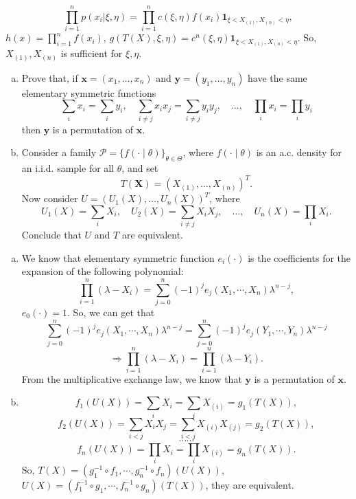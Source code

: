 \begin{solution}
    \[
        \prod_{i=1}^np(x_i|\xi, \eta)=\prod_{i=1}^nc(\xi, \eta) f(x_i)\mathbf{1}_{\xi<X_{(1)}, X_{(n)}<\eta}, 
    \]
    $h(x)=\prod_{i=1}^nf(x_i)$, $g(T(X),\xi,\eta)=c^n(\xi,\eta)\mathbf{1}_{\xi<X_{(1)}, X_{(n)}<\eta}$. So, $X_{(1)}, X_{(n)}$ is sufficient for $\xi,\eta$. 
\end{solution}


\begin{exercise}
    \begin{enumerate}[(a)]
        \item Prove that, if \(\mathbf{x}=\left(x_{1}, \ldots, x_{n}\right)\) and \(\mathbf{y}=\left(y_{1}, \ldots, y_{n}\right)\) have the same elementary symmetric functions
        \[
            \sum_{i} x_{i}=\sum_{i} y_{i}, \quad \sum_{i \neq j} x_{i} x_{j}=\sum_{i \neq j} y_{i} y_{j}, \quad \ldots, \quad \prod_{i} x_{i}=\prod_{i} y_{i}
        \]
        then \(\mathbf{y}\) is a permutation of \(\mathbf{x}\). 
        \item Consider a family \(\mathcal{P}=\{f(\cdot \mid \theta)\}_{\theta \in \Theta}\), where \(f(\cdot \mid \theta)\) is an a.c. density for an i.i.d. sample for all \(\theta\), and set
        \[
            T(\mathbf{X})=\left(X_{(1)}, \ldots, X_{(n)}\right)^T .
        \]
        Now consider \(U=\left(U_{1}(X), \ldots, U_{n}(X)\right)^T\), where
        \[
            U_{1}(X)=\sum_{i} X_{i}, \quad U_{2}(X)=\sum_{i \neq j} X_{i} X_{j}, \quad \ldots, \quad U_{n}(X)=\prod_{i} X_{i} .
        \]
        Conclude that \(U\) and \(T\) are equivalent. 
    \end{enumerate}
\end{exercise}

\begin{solution}
    \begin{enumerate}[(a)]
        \item We know that elementary symmetric function $e_i(\cdot)$ is the coefficients for the expansion of the following polynomial: 
        \[
            \prod_{i=1}^n(\lambda-X_i)=\sum_{j=0}^n(-1)^je_j(X_1,\cdots,X_n)\lambda^{n-j}, 
        \]
        $e_0(\cdot)=1$. So, we can get that 
        \[
            \sum_{j=0}^n(-1)^je_j(X_1,\cdots,X_n)\lambda^{n-j}=\sum_{j=0}^n(-1)^je_j(Y_1,\cdots,Y_n)\lambda^{n-j}
        \]
        \[
            \Rightarrow \prod_{i=1}^n(\lambda-X_i)=\prod_{i=1}^n(\lambda-Y_i). 
        \]
        From the multiplicative exchange law, we know that \(\mathbf{y}\) is a permutation of \(\mathbf{x}\). 
        \item 
        \[
            f_1(U(X))=\sum_iX_i=\sum_iX_{(i)}=g_1(T(X)), 
        \]
        \[
            f_2(U(X))=\sum_{i<j}X_iX_j=\sum_{i<j}X_{(i)}X_{(j)}=g_2(T(X)), 
        \]
        \[
            \cdots\cdots
        \]
        \[
            f_n(U(X))=\prod_{i}X_i=\prod_{i}X_{(i)}=g_n(T(X)). 
        \]
        So, $T(X)=(g_1^{-1}\circ f_1,\cdots,g_n^{-1}\circ f_n)(U(X))$, $U(X)=(f_1^{-1}\circ g_1,\cdots,f_n^{-1}\circ g_n)(T(X))$, they are equivalent. 
    \end{enumerate}
\end{solution}

